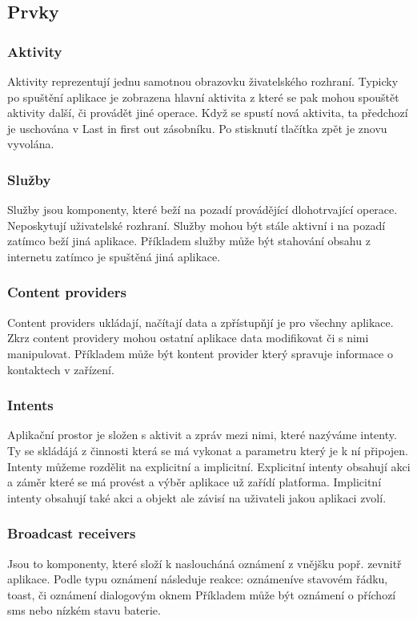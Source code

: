 \subsection{Prvky}
\subsubsection{Aktivity}%
Aktivity reprezentují jednu samotnou obrazovku živatelského rozhraní. Typicky po spuštění aplikace je zobrazena hlavní aktivita z které se pak mohou spouštět aktivity další, či provádět jiné operace. Když se spustí nová aktivita, ta předchozí je uschována v Last in first out zásobníku. Po stisknutí tlačítka zpět je znovu vyvolána.

\subsubsection{Služby}
Služby jsou komponenty, které beží na pozadí provádějící dlohotrvající operace. Neposkytují uživatelské rozhraní. Služby mohou být stále aktivní i na pozadí zatímco beží jiná aplikace. Příkladem služby může být stahování obsahu z internetu zatímco je spuštěná jiná aplikace.

\subsubsection{Content providers} %
Content providers ukládají, načítají data a zpřístupňjí je pro všechny aplikace. Zkrz content providery mohou ostatní aplikace data modifikovat či s nimi manipulovat. Příkladem může být kontent provider který spravuje informace o kontaktech v zařízení.

\subsubsection{Intents}
Aplikační prostor je složen s aktivit a zpráv mezi nimi, které nazýváme intenty. Ty se skládájá z činnosti která se má vykonat a parametru který je k ní připojen. Intenty můžeme rozdělit na explicitní a implicitní. Explicitní intenty obsahují akci a záměr které se má provést a výběr aplikace už zařídí platforma.  Implicitní intenty obsahují také akci a objekt ale závisí na uživateli jakou aplikaci zvolí.

\subsubsection{Broadcast receivers}
Jsou to komponenty, které složí k nasloucháná oznámení z vnějšku popř. zevnitř aplikace. Podle typu oznámení následuje reakce: oznámeníve stavovém řádku, toast, či oznámení dialogovým oknem Příkladem může být oznámení o příchozí sms nebo nízkém stavu baterie.

